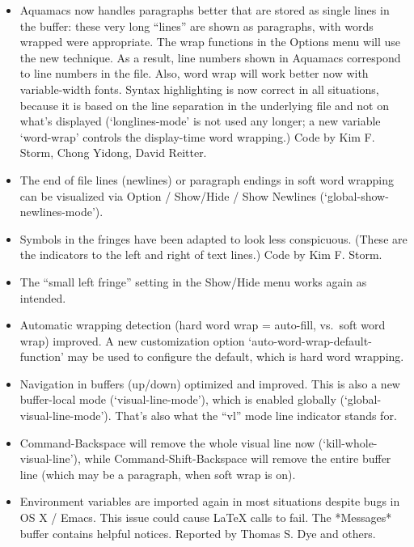 \begin{itemize}

\item Aquamacs now handles paragraphs better that are stored as single lines in the buffer: these very long ``lines'' are shown as paragraphs, with words wrapped were appropriate.  The wrap functions in the Options menu will use the new technique.  As a result, line numbers shown in Aquamacs correspond to line numbers in the file.  Also, word wrap will work better now with variable-width fonts.  Syntax highlighting is now correct in all situations, because it is based on the line separation in the underlying file and not on what's displayed  (`longlines-mode' is not used any longer; a new variable `word-wrap' controls the display-time word wrapping.)
Code by Kim F. Storm, Chong Yidong, David Reitter.

\item The end of file lines (newlines) or paragraph endings in soft word wrapping can be visualized via Option / Show/Hide / Show Newlines (`global-show-newlines-mode').

\item Symbols in the fringes have been adapted to look less conspicuous. (These are the indicators to the left and right of text lines.)
Code by Kim F. Storm.

\item The ``small left fringe'' setting in the Show/Hide menu works again as intended.

\item Automatic wrapping detection (hard word wrap = auto-fill, vs.~soft word wrap) improved.  A new customization option `auto-word-wrap-default-function' may be used to configure the default, which is hard word wrapping.

\item Navigation in buffers (up/down) optimized and improved.  This is also a new buffer-local mode (`visual-line-mode'), which is enabled globally (`global-visual-line-mode').  That's also what the ``vl'' mode line indicator stands for.

\item Command-Backspace will remove the whole visual line now (`kill-whole-visual-line'), while Command-Shift-Backspace will remove the entire buffer line (which may be a paragraph, when soft wrap is on).

\item Environment variables are imported again in most situations despite bugs in OS X / Emacs.  This issue could cause LaTeX calls to fail. The *Messages* buffer contains helpful notices. Reported by Thomas S. Dye and others.


\end{itemize}
